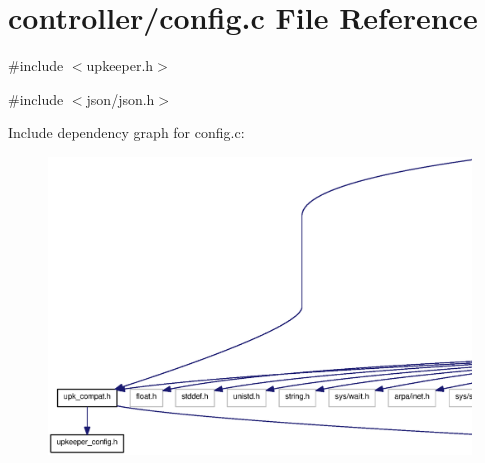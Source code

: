 \section{controller/config.c File Reference}
\label{controller_2config_8c}
{\ttfamily \#include $<$upkeeper.h$>$}\par
{\ttfamily \#include $<$json/json.h$>$}\par
Include dependency graph for config.c:\nopagebreak
\begin{figure}[H]
\begin{center}
\leavevmode
\includegraphics[width=400pt]{controller_2config_8c__incl}
\end{center}
\end{figure}
